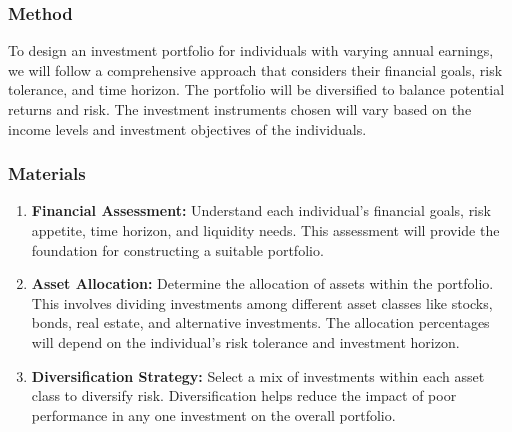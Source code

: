 \subsubsection{Method}
To design an investment portfolio for individuals with varying annual earnings, we will follow a comprehensive approach that considers their financial goals, risk tolerance, and time horizon. The portfolio will be diversified to balance potential returns and risk. The investment instruments chosen will vary based on the income levels and investment objectives of the individuals.

\subsubsection{Materials}
\begin{enumerate}
    \item \textbf{Financial Assessment:} Understand each individual's financial goals, risk appetite, time horizon, and liquidity needs. This assessment will provide the foundation for constructing a suitable portfolio.
    
    \item \textbf{Asset Allocation:} Determine the allocation of assets within the portfolio. This involves dividing investments among different asset classes like stocks, bonds, real estate, and alternative investments. The allocation percentages will depend on the individual's risk tolerance and investment horizon.
    
    \item \textbf{Diversification Strategy:} Select a mix of investments within each asset class to diversify risk. Diversification helps reduce the impact of poor performance in any one investment on the overall portfolio.
    

\end{enumerate}
